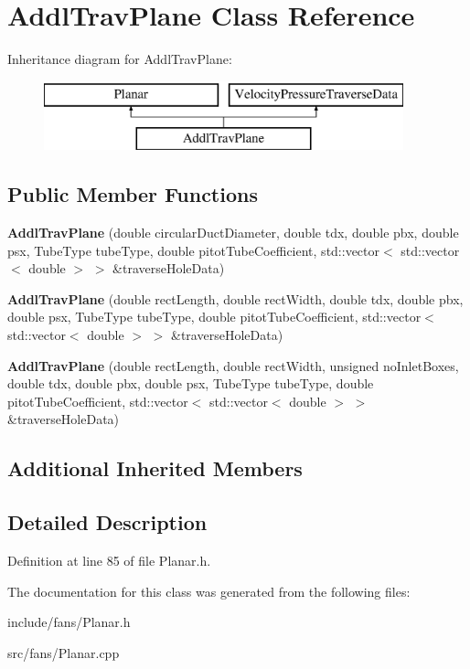 \hypertarget{class_addl_trav_plane}{}\section{Addl\+Trav\+Plane Class Reference}
\label{class_addl_trav_plane}
Inheritance diagram for Addl\+Trav\+Plane\+:\begin{figure}[H]
\begin{center}
\leavevmode
\includegraphics[height=2.000000cm]{d6/dc1/class_addl_trav_plane}
\end{center}
\end{figure}
\subsection*{Public Member Functions}
\begin{DoxyCompactItemize}
\item 
\mbox{\label{class_addl_trav_plane_a99ca98acd04b32ad5c949948e0e27cdb}} 
{\bfseries Addl\+Trav\+Plane} (double circular\+Duct\+Diameter, double tdx, double pbx, double psx, Tube\+Type tube\+Type, double pitot\+Tube\+Coefficient, std\+::vector$<$ std\+::vector$<$ double $>$ $>$ \&traverse\+Hole\+Data)
\item 
\mbox{\label{class_addl_trav_plane_a5d47927388be5a31103f4b7ace4fab37}} 
{\bfseries Addl\+Trav\+Plane} (double rect\+Length, double rect\+Width, double tdx, double pbx, double psx, Tube\+Type tube\+Type, double pitot\+Tube\+Coefficient, std\+::vector$<$ std\+::vector$<$ double $>$ $>$ \&traverse\+Hole\+Data)
\item 
\mbox{\label{class_addl_trav_plane_a11033027d926df2358c4f24fe0e85abd}} 
{\bfseries Addl\+Trav\+Plane} (double rect\+Length, double rect\+Width, unsigned no\+Inlet\+Boxes, double tdx, double pbx, double psx, Tube\+Type tube\+Type, double pitot\+Tube\+Coefficient, std\+::vector$<$ std\+::vector$<$ double $>$ $>$ \&traverse\+Hole\+Data)
\end{DoxyCompactItemize}
\subsection*{Additional Inherited Members}


\subsection{Detailed Description}


Definition at line 85 of file Planar.\+h.



The documentation for this class was generated from the following files\+:\begin{DoxyCompactItemize}
\item 
include/fans/Planar.\+h\item 
src/fans/Planar.\+cpp\end{DoxyCompactItemize}

